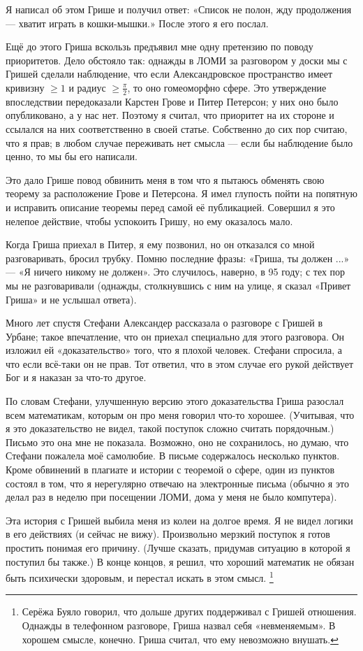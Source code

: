 \documentclass{book}
\begin{document}
Я написал об этом Грише и получил ответ: «Список не полон, жду продолжения --- хватит играть в кошки-мышки.»
После этого я его послал.

Ещё до этого Гриша вскользь предъявил мне одну претензию по поводу приоритетов.
Дело обстояло так: однажды в ЛОМИ за разговором у доски мы с Гришей сделали наблюдение, что если Александровское пространство имеет кривизну $\geqslant 1$ и радиус $\geqslant \tfrac\pi2$, то оно гомеоморфно сфере.
Это утверждение впоследствии передоказали Карстен Грове и Питер Петерсон; у них оно было опубликовано, а у нас нет.
Поэтому я считал, что приоритет на их стороне и ссылался на них соответственно в своей статье.
Собственно до сих пор считаю, что я прав; в любом случае переживать нет смысла --- если бы наблюдение было ценно, то мы бы его написали.

Это дало Грише повод обвинить меня в том что я пытаюсь обменять свою теорему за расположение Грове и Петерсона.
Я имел глупость пойти на попятную и исправить описание теоремы перед самой её публикацией.
Совершил я это нелепое действие, чтобы успокоить Гришу, но ему оказалось мало.

Когда Гриша приехал в Питер, я ему позвонил, но он отказался со мной разговаривать, бросил трубку.
Помню последние фразы: «Гриша, ты должен ...» --- «Я ничего никому не должен».
Это случилось, наверно, в 95 году; с тех пор мы не разговаривали (однажды, столкнувшись с ним на улице, я сказал «Привет Гриша» и не услышал ответа).

Много лет спустя Стефани Александер рассказала о разговоре с Гришей в Урбане;
такое впечатление, что он приехал специально для этого разговора.
Он изложил ей «доказательство» того, что я плохой человек.
Стефани спросила, а что если всё-таки он не прав.
Тот ответил, что в этом случае его рукой действует Бог и я наказан за что-то другое.

По словам Стефани, улучшенную версию этого доказательства Гриша разослал всем математикам, которым он про меня говорил что-то хорошее.
(Учитывая, что я это доказательство не видел, такой поступок сложно считать порядочным.)
Письмо это она мне не показала.
Возможно, оно не сохранилось, но думаю, что Стефани пожалела моё самолюбие.
В письме содержалось несколько пунктов.
Кроме обвинений в плагиате и истории с теоремой о сфере, один из пунктов состоял в том, что я нерегулярно отвечаю на электронные письма (обычно я это делал раз в неделю при посещении ЛОМИ, дома у меня не было компутера).

Эта история с Гришей выбила меня из колеи на долгое время.
Я не видел логики в его действиях (и сейчас не вижу).
Произвольно мерзкий поступок я готов простить понимая его причину.
(Лучше сказать, придумав ситуацию в которой я поступил бы также.)
В конце концов, я решил, что хороший математик не обязан быть психически здоровым, и перестал искать в этом смысл.%
\footnote{Серёжа Буяло говорил, что дольше других поддерживал с Гришей отношения.
Однажды в телефонном разговоре, Гриша назвал себя «невменяемым».
В хорошем смысле, конечно.
Гриша считал, что ему невозможно внушать.}
\end{document}
